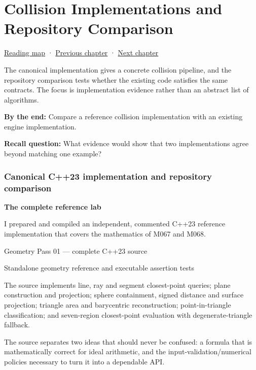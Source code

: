 \hypertarget{03-visual-computing-i-ch021}{}
\chapter{Collision Implementations and Repository Comparison}\label{stagechapter:03-visual-computing-i-ch021}\label{03-visual-computing-i-ch021-collision-implementations-and-repository-comparison}

\hyperref[volume-reading-map]{Reading map} · \hyperref[03-visual-computing-i-ch020-geometry-queries-from-scene-to-contact]{Previous chapter} · \hyperref[04-visual-computing-ii-ch022-convex-support-mapping-and-distance]{Next chapter}

The canonical implementation gives a concrete collision pipeline, and the repository comparison tests whether the existing code satisfies the same contracts. The focus is implementation evidence rather than an abstract list of algorithms.

\textbf{By the end:} Compare a reference collision implementation with an existing engine implementation.

\textbf{Recall question:} What evidence would show that two implementations agree beyond matching one example?

\subsection{Canonical C++23 implementation and repository comparison}\label{03-visual-computing-i-ch021-canonical-c23-implementation-and-repository-comparison}

\textbf{The complete reference lab}

I prepared and compiled an independent, commented C++23 reference implementation that covers the mathematics of M067 and M068.

Geometry Pass 01 --- complete C++23 source

Standalone geometry reference and executable assertion tests

The source implements line, ray and segment closest-point queries; plane construction and projection; sphere containment, signed distance and surface projection; triangle area and barycentric reconstruction; point-in-triangle classification; and seven-region closest-point evaluation with degenerate-triangle fallback.

The source separates two ideas that should never be confused: a formula that is mathematically correct for ideal arithmetic, and the input-validation/numerical policies necessary to turn it into a dependable API.

